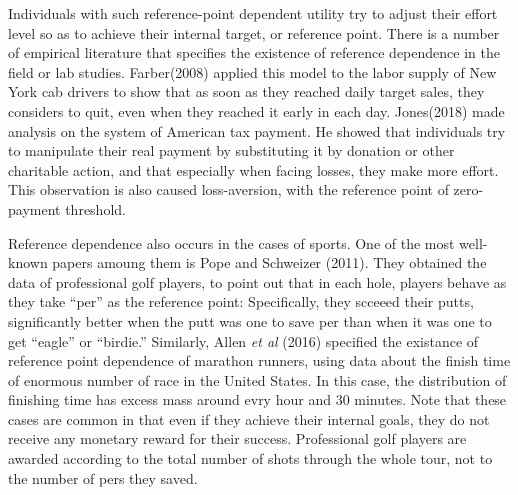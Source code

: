 \documentclass[dvipdfmx, 12pt]{article}
\begin{document}
  \vspace{1zw}

  Individuals with such reference-point dependent utility try to adjust their effort level so as to achieve their internal target, or reference point. There is a number of empirical literature that specifies the existence of reference dependence in the field or lab studies. Farber(2008) applied this model to the labor supply of New York cab drivers to show that as soon as they reached daily target sales, they considers to quit, even when they reached it early in each day. Jones(2018) made analysis on the system of American tax payment. He showed that individuals try to manipulate their real payment by substituting it by donation or other charitable action, and that especially when facing losses, they make more effort. This observation is also caused loss-aversion, with the reference point of zero-payment threshold.

  Reference dependence also occurs in the cases of sports. One of the most well-known papers amoung them is Pope and Schweizer (2011). They obtained the data of professional golf players, to point out that in each hole, players behave as they take ``per'' as the reference point: Specifically, they scceeed their putts, significantly better when the putt was one to save per than when it was one to get ``eagle'' or ``birdie.'' Similarly, Allen \textit{et al} (2016) specified the existance of reference point dependence of marathon runners, using data about the finish time of enormous number of race in the United States. In this case, the distribution of finishing time has excess mass around evry hour and 30 minutes. Note that these cases are common in that even if they achieve their internal goals, they do not receive any monetary reward for their success. Professional golf players are awarded according to the total number of shots through the whole tour, not to the number of pers they saved.
\end{document}
